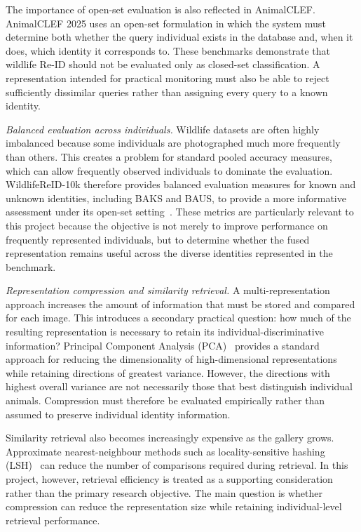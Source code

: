 \documentclass[runningheads]{llncs}
\begin{document}
The importance of open-set evaluation is also reflected in AnimalCLEF.
AnimalCLEF 2025 uses an open-set formulation in which the system must
determine both whether the query individual exists in the database and, when
it does, which identity it corresponds to. These
benchmarks demonstrate that wildlife Re-ID should not be evaluated only as
closed-set classification. A representation intended for practical
monitoring must also be able to reject sufficiently dissimilar queries
rather than assigning every query to a known identity.

\emph{Balanced evaluation across individuals.}
Wildlife datasets are often highly imbalanced because some individuals are
photographed much more frequently than others. This creates a problem for
standard pooled accuracy measures, which can allow frequently observed
individuals to dominate the evaluation. WildlifeReID-10k therefore provides
balanced evaluation measures for known and unknown identities, including
BAKS and BAUS, to provide a more informative assessment under its open-set
setting~\cite{adam2025wildlifereid}. These metrics are particularly relevant
to this project because the objective is not merely to improve performance
on frequently represented individuals, but to determine whether the fused
representation remains useful across the diverse identities represented in
the benchmark.

\emph{Representation compression and similarity retrieval.}
A multi-representation approach increases the amount of information that
must be stored and compared for each image. This introduces a secondary
practical question: how much of the resulting representation is necessary
to retain its individual-discriminative information? Principal Component
Analysis (PCA)~\cite{jolliffe2002pca} provides a standard approach for
reducing the dimensionality of high-dimensional representations while
retaining directions of greatest variance. However, the directions with
highest overall variance are not necessarily those that best distinguish
individual animals. Compression must therefore be evaluated empirically
rather than assumed to preserve individual identity information.

Similarity retrieval also becomes increasingly expensive as the gallery
grows. Approximate nearest-neighbour methods such as locality-sensitive
hashing (LSH)~\cite{indyk1998lsh} can reduce the number of comparisons
required during retrieval. In this project, however, retrieval efficiency
is treated as a supporting consideration rather than the primary research
objective. The main question is whether compression can reduce the
representation size while retaining individual-level retrieval performance.
\end{document}

